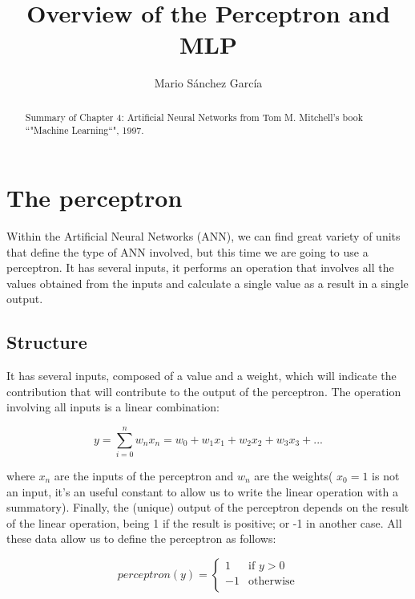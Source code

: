 \documentclass{article}
\begin{document}
\title{Overview of the Perceptron and MLP}
\author{Mario Sánchez García}

\maketitle

\vfill
\begin{abstract}
	\begin{center}
	Summary of Chapter 4: Artificial Neural Networks from Tom M. Mitchell's book ``"Machine Learning``", 1997.
	\end{center}
\end{abstract}
\clearpage

\tableofcontents
\clearpage

\section{The perceptron}
Within the Artificial Neural Networks (ANN), we can find great variety of units that define the type of ANN involved, but this time we are going to use a perceptron. It has several inputs, it performs an operation that involves all the values obtained from the inputs and calculate a single value as a result in a single output.

	\subsection{Structure}
	It has several inputs, composed of a value and a weight, which will indicate the contribution that will contribute to the output of the perceptron. The operation involving all inputs is a linear combination:

	\begin{equation}
	    \label{linear_combination}
	        y=\sum_{i=0}^{n} w_n x_n = w_0 + w_1 x_1 + w_2 x_2 + w_3 x_3 + ...%
	\end{equation}

	where $x_n$ are the inputs of the perceptron and $w_n$ are the weights( $x_0=1$ is not an input, it's an useful constant to allow us to write the linear operation with a summatory). Finally, the (unique) output of the perceptron depends on the result of the linear operation, being 1 if the result is positive; or -1 in another case. All these data allow us to define the perceptron as follows:

	\begin{equation}
	    \label{perceptron_rule}
		perceptron(y) =
			\begin{cases}
		     	1 & \text{if $y>0$} \\
		          -1 & \text{otherwise} \\
			\end{cases}
	\end{equation}
\end{document}
